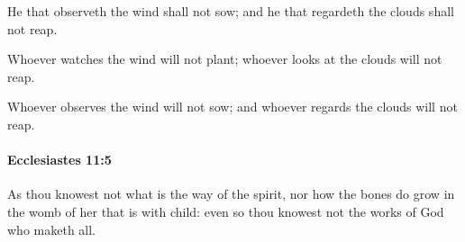 			\begin{versebox}
					\item[BHS] 
					\item[LXX] 
					\item[ASV] He that observeth the wind shall not sow; and he that regardeth the clouds shall not reap.
					\item[NIV] Whoever watches the wind will not plant; whoever looks at the clouds will not reap.
					\item[NRSV] Whoever observes the wind will not sow; and whoever regards the clouds will not reap.
			\end{versebox}

		\paragraph{Ecclesiastes 11:5} %
			\label{ECCLESIASTES-11-5}

			As thou knowest not what is the way of the spirit, nor how the bones do grow in the womb of her that is with child: even so thou knowest not the works of God who maketh all.

